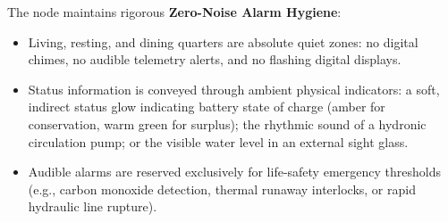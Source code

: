 The node maintains rigorous \textbf{Zero-Noise Alarm Hygiene}:
\begin{itemize}
    \item Living, resting, and dining quarters are absolute quiet zones: no digital chimes, no audible telemetry alerts, and no flashing digital displays.
    \item Status information is conveyed through ambient physical indicators: a soft, indirect status glow indicating battery state of charge (amber for conservation, warm green for surplus); the rhythmic sound of a hydronic circulation pump; or the visible water level in an external sight glass.
    \item Audible alarms are reserved exclusively for life-safety emergency thresholds (e.g., carbon monoxide detection, thermal runaway interlocks, or rapid hydraulic line rupture).
\end{itemize}

